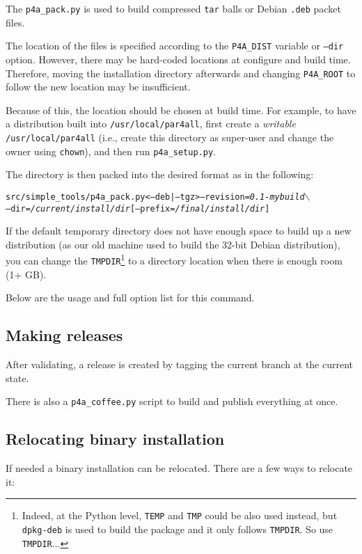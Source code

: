 \documentclass[a4paper]{article}
\begin{document}
The \verb|p4a_pack.py| is used to build compressed \texttt{tar} balls or Debian
\texttt{.deb} packet files.

The location of the \Apfa files is specified according
to the \verb|P4A_DIST| variable or \texttt{--dir} option. However, there may be
hard-coded locations at configure and build time. Therefore, moving the
installation directory afterwards and changing \verb|P4A_ROOT| to follow
the new location may be insufficient.

Because of this, the location should be chosen at build time. For
example, to have a distribution built
into \texttt{/usr/local/par4all},
first create a \emph{writable} \texttt{/usr/local/par4all} (i.e.,
create this directory as super-user and change the owner using
\texttt{chown}), and then run \verb|p4a_setup.py|.

The directory is then packed into the desired format as in the
following:
\begin{alltt}
src/simple_tools/p4a_pack.py <--deb|--tgz> --revision=\emph{0.1-mybuild} \(\backslash\)
  --dir=\emph{/current/install/dir} [--prefix=\emph{/final/install/dir}]
\end{alltt}

If the default temporary directory does not have enough space to build up a new
distribution (as our old machine used to build the 32-bit Debian
distribution), you can change the \texttt{TMPDIR}\footnote{Indeed, at the
  Python level, \texttt{TEMP} and \texttt{TMP} could be also used instead,
  but \texttt{dpkg-deb} is used to build the package and it only follows
  \texttt{TMPDIR}. So use \texttt{TMPDIR}...} to a directory location when
there is enough room (1+ GB).

Below are the usage and full option list for this command.





\subsection{Making releases}
\label{sec:releases}

After validating, a release is created by tagging the current branch
at the current state.

There is also a \verb|p4a_coffee.py| script to build and publish everything
at once.



\subsection{Relocating binary installation}
\label{sec:relocation}
If needed a \Apfa binary installation can be relocated. There are a few ways to relocate it:
\end{document}
